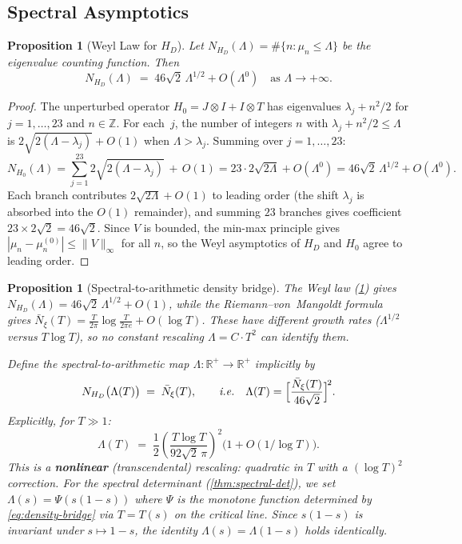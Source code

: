 \documentclass[11pt,a4paper]{article}
\theoremstyle{plain}
\newtheorem{proposition}[theorem]{Proposition}
\theoremstyle{remark}
\newcommand{\Z}{\mathbb{Z}}
\newcommand{\R}{\mathbb{R}}
\newcommand{\norm}[1]{\lVert #1 \rVert}
\begin{document}
\subsection{Spectral Asymptotics}
\label{sec:weyl}

\begin{proposition}[Weyl Law for $H_D$]\label{prop:weyl}
Let $N_{H_D}(\Lambda)=\#\{n:\mu_n\leq\Lambda\}$ be the eigenvalue
counting function.  Then
\begin{equation}\label{eq:weyl}
  N_{H_D}(\Lambda) \;=\; 46\sqrt{2}\,\Lambda^{1/2}
  + O(\Lambda^0)
  \quad\text{as }\Lambda\to+\infty.
\end{equation}
\end{proposition}

\begin{proof}
The unperturbed operator $H_0=J\otimes I+I\otimes T$ has eigenvalues
$\lambda_j+n^2/2$ for $j=1,\ldots,23$ and $n\in\Z$.
For each~$j$, the number of integers $n$ with $\lambda_j+n^2/2\leq\Lambda$
is $2\sqrt{2(\Lambda-\lambda_j)}+O(1)$ when $\Lambda>\lambda_j$.
Summing over $j=1,\ldots,23$:
\[
  N_{H_0}(\Lambda) = \sum_{j=1}^{23}
  2\sqrt{2(\Lambda-\lambda_j)}\,+\,O(1)
  = 23\cdot 2\sqrt{2\Lambda}+O(\Lambda^0)
  = 46\sqrt{2}\,\Lambda^{1/2}+O(\Lambda^0).
\]
Each branch contributes $2\sqrt{2\Lambda}+O(1)$ to leading order
(the shift $\lambda_j$ is absorbed into the $O(1)$ remainder),
and summing $23$ branches gives coefficient $23\times 2\sqrt{2}=46\sqrt{2}$.
Since $V$ is bounded, the min-max principle gives
$|\mu_n-\mu_n^{(0)}|\leq\norm{V}_\infty$ for all $n$, so the Weyl
asymptotics of $H_D$ and $H_0$ agree to leading order.
\end{proof}

\begin{proposition}[Spectral-to-arithmetic density bridge]
\label{prop:density-bridge}
The Weyl law (\cref{prop:weyl}) gives
$N_{H_D}(\Lambda) = 46\sqrt{2}\,\Lambda^{1/2} + O(1)$, while
the Riemann--von~Mangoldt formula gives
$\bar N_\xi(T) = \tfrac{T}{2\pi}\log\tfrac{T}{2\pi e} + O(\log T)$.
These have different growth rates ($\Lambda^{1/2}$ versus $T\log T$),
so no constant rescaling $\Lambda = C\cdot T^2$ can identify them.

Define the spectral-to-arithmetic map
$\Lambda\colon\R^+\to\R^+$ implicitly by
\begin{equation}\label{eq:density-bridge}
  N_{H_D}\bigl(\Lambda(T)\bigr) \;=\; \bar N_\xi(T),
  \qquad\textit{i.e.}\quad
  \Lambda(T) = \Bigl[\frac{\bar N_\xi(T)}{46\sqrt{2}}\Bigr]^{\!2}.
\end{equation}
Explicitly, for $T\gg 1$:
\[
  \Lambda(T) \;=\; \frac{1}{2}\!
  \left(\frac{T\log T}{92\sqrt{2}\,\pi}\right)^{\!2}
  \bigl(1 + O(1/\log T)\bigr).
\]
This is a \textbf{nonlinear} (transcendental) rescaling: quadratic
in $T$ with a $(\log T)^2$ correction.  For the spectral determinant
(\cref{thm:spectral-det}), we set $\Lambda(s) = \Psi(s(1{-}s))$
where $\Psi$ is the monotone function determined by
\cref{eq:density-bridge} via $T = T(s)$ on the critical line.
Since $s(1{-}s)$ is invariant under $s\mapsto 1{-}s$,
the identity $\Lambda(s) = \Lambda(1{-}s)$ holds identically.
\end{proposition}
\end{document}
